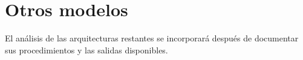 \section{Otros modelos}

El análisis de las arquitecturas restantes se incorporará después de documentar sus procedimientos y las salidas disponibles.
